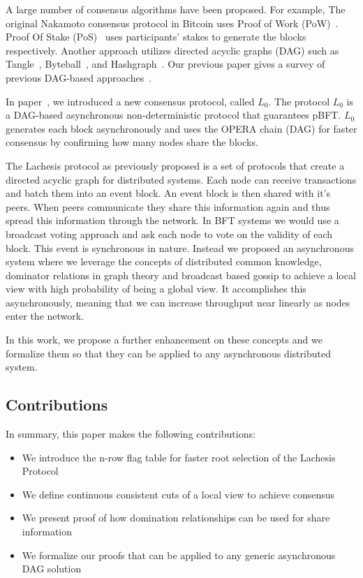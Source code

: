 \documentclass{article}
\begin{document}
A large number of consensus algorithms have been proposed. For example, 
The original Nakamoto consensus protocol in Bitcoin uses Proof of Work (PoW)~\cite{bitcoin08}. Proof Of Stake (PoS)~\cite{ppcoin12,dpos14} uses participants' stakes to generate the blocks respectively. 
Another approach utilizes directed acyclic graphs (DAG) such as Tangle~\cite{tangle17}, Byteball~\cite{byteball16}, and Hashgraph~\cite{hashgraph16}. Our previous paper gives a survey of previous DAG-based approaches~\cite{lachesis01}.

In paper~\cite{lachesis01},  we introduced a new consensus protocol, called $L_0$. The protocol $L_0$ is a DAG-based asynchronous non-deterministic protocol that guarantees pBFT.
$L_0$ generates each block asynchronously and uses the OPERA chain (DAG) for faster consensus by confirming how many nodes share the blocks.

The Lachesis protocol as previously proposed is a set of protocols that create a directed acyclic graph for distributed systems. Each node can receive transactions and batch them into an event block. An event block is then shared with it's peers. When peers communicate they share this information again and thus spread this information through the network. In BFT systems we would use a broadcast voting approach and ask each node to vote on the validity of each block. This event is synchronous in nature. Instead we proposed an asynchronous system where we leverage the concepts of distributed common knowledge, dominator relations in graph theory and broadcast based gossip to achieve a local view with high probability of being a global view. It accomplishes this asynchronously, meaning that we can increase throughput near linearly as nodes enter the network.

In this work, we propose a further enhancement on these concepts and we formalize them so that they can be applied to any asynchronous distributed system.

\subsection{Contributions}

In summary, this paper makes the following contributions:

\begin{itemize}
\item We introduce the n-row flag table for faster root selection of the Lachesis Protocol
\item We define continuous consistent cuts of a local view to achieve consensus
\item We present proof of how domination relationships can be used for share information
\item We formalize our proofs that can be applied to any generic asynchronous DAG solution
\end{itemize}
\end{document}
